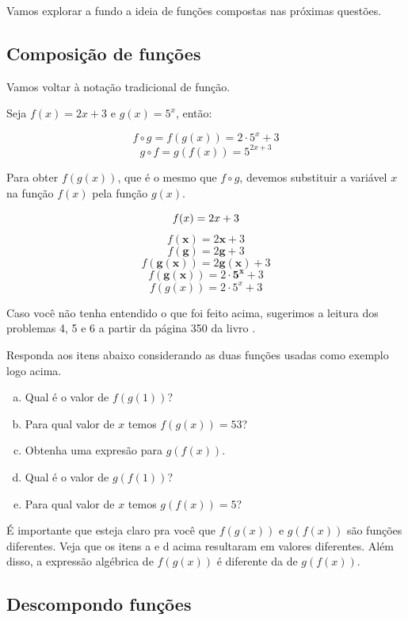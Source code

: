 \documentclass[main_estudante.tex]{subfiles}
\begin{document}
Vamos explorar a fundo a ideia de funções compostas nas próximas questões.

\subsection*{Composição de funções}

Vamos voltar à notação tradicional de função.

\begin{shaded*}
Seja $f(x)=2x+3$ e $g(x)=5^x$, então:

$$ f \circ g = f(g(x)) = 2 \cdot 5^x + 3 $$
$$ g \circ f = g(f(x)) = 5^{2x+3}$$
\end{shaded*}

Para obter $f(g(x))$, que é o mesmo que $f \circ g$, devemos substituir a variável $x$ na função $f(x)$ pela função $g(x)$.

$$ f(x)=2x+3 \newline $$
$$ f(\mathbf{x})=2 \mathbf{x}+3  $$
$$ f(\mathbf{g})=2 \mathbf{g}+3  $$
$$ f(\mathbf{g(x)})=2 \mathbf{g(x)}+3  $$
$$ f(\mathbf{g(x)})=2 \cdot \mathbf{5^x}+3  $$
$$f(g(x))=2 \cdot 5^x+3  $$

Caso você não tenha entendido o que foi feito acima, sugerimos a leitura dos problemas 4, 5 e 6 a partir da página 350 da livro .

\begin{questao}
Responda aos itens abaixo considerando as duas funções usadas como exemplo logo acima.
\begin{enumerate}[a)]
\item Qual é o valor de $f(g(1))$?
\item Para qual valor de $x$ temos $f(g(x))=53$?
\item Obtenha uma expresão para $g(f(x))$.
\item Qual é o valor de $g(f(1))$?
\item Para qual valor de $x$ temos $g(f(x))=5$?
\end{enumerate}
\end{questao}

É importante que esteja claro pra você que $f(g(x))$ e $g(f(x))$ são funções diferentes. Veja que os itens a e d acima resultaram em valores diferentes. Além disso, a expressão algébrica de $f(g(x))$ é diferente da de $g(f(x))$.

\subsection*{Descompondo funções}
\end{document}
